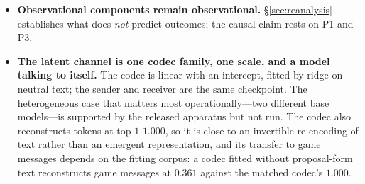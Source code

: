\begin{itemize}[leftmargin=1.1em,itemsep=2pt,topsep=2pt]
prompt scaffold. The first-person-plural cue is a linguistic proxy for a semantic
property, and the mapping may not transfer across languages.
\item \textbf{Observational components remain observational.} \S\ref{sec:reanalysis}
establishes what does \emph{not} predict outcomes; the causal claim rests on P1 and P3.
\item \textbf{The latent channel is one codec family, one scale, and a model
talking to itself.} The codec is linear with an intercept, fitted by ridge on neutral
text; the sender and receiver are the same checkpoint. The heterogeneous case that
matters most operationally---two different base models---is supported by the released
apparatus but not run. The codec also reconstructs tokens at top-$1$ $1.000$, so it is
close to an invertible re-encoding of text rather than an emergent representation, and
its transfer to game messages depends on the fitting corpus: a codec fitted without
proposal-form text reconstructs game messages at $0.361$ against the matched codec's
$1.000$.
\end{itemize}

